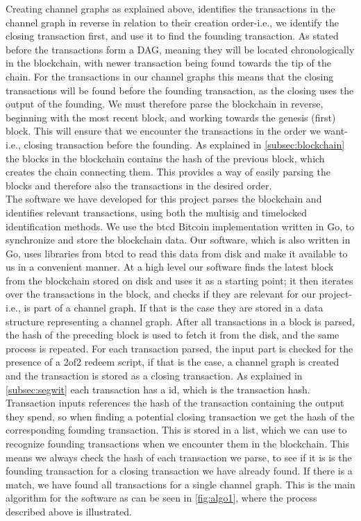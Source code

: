 Creating channel graphs as explained above, identifies the transactions in the channel graph in reverse in relation to their creation order-i.e., we identify the closing transaction first, and use it to find the founding transaction. As stated before the transactions form a DAG, meaning they will be located chronologically in the blockchain, with newer transaction being found towards the tip of the chain. For the transactions in our channel graphs this means that the closing transactions will be found before the founding transaction, as the closing uses the output of the founding.
We must therefore parse the blockchain in reverse, beginning with the most recent block, and working towards the genesis (first) block.
This will ensure that we encounter the transactions in the order we want-i.e., closing transaction before the founding.
As explained in \cref{subsec:blockchain} the  blocks in the blockchain contains the hash of the previous block, which creates the chain connecting them. This provides a way of easily parsing the blocks and therefore also the transactions in the desired order. 
\\

The software we have developed for this project parses the blockchain and identifies relevant transactions, using both the multisig and timelocked identification methods.
We use the btcd \cite{btcd_roasbeef} Bitcoin implementation written in Go, to synchronize and store the blockchain data.
Our software, which is also written in Go, uses libraries from btcd to read this data from disk and make it available to us in a convenient manner.
At a high level our software finds the latest block from the blockchain stored on disk and uses it as a starting point;
it then iterates over the transactions in the block, and checks if they are relevant for our project-i.e., is part of a channel graph. If that is the case they are stored in a data structure representing a channel graph. After all transactions in a block is parsed, the hash of the preceding block is used to fetch it from the disk, and the same process is repeated.
For each transaction parsed, the input part is checked for the presence of a 2of2 redeem script, if that is the case, a channel graph is created and the transaction is stored as a closing transaction.
As explained in \cref{subsec:segwit} each transaction has a id, which is the transaction hash.
Transaction inputs references the hash of the transaction containing the output they spend, so when finding a potential closing transaction we get the hash of the corresponding founding transaction.
This is stored in a list, which we can use to recognize founding transactions when we encounter them in the blockchain.
This means we always check the hash of each transaction we parse, to see if it is is the founding transaction for a closing transaction we have already found. If there is a match, we have found all transactions for a single channel graph. This is the main algorithm for the software as can be seen in \cref{fig:algo1}, where the process described above is illustrated.

